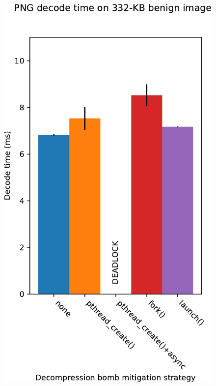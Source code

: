 \begin{figure}
	\begin{minipage}{0.23\textwidth}
	\includegraphics[width=\textwidth]{figs/cerberus2_nns16_surplus256k_mirjam}
	\label{fig:libpng:benign}
	\end{minipage}
%
	\begin{minipage}{0.24\textwidth}

\end{minipage}
\end{figure}
